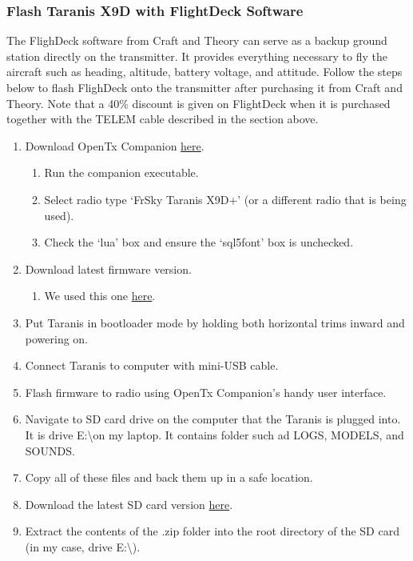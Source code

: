 \documentclass[12pt,journal,compsoc]{IEEEtran}
\begin{document}
\subsubsection{Flash Taranis X9D with FlightDeck Software}
The FlighDeck software from Craft and Theory can serve as a backup ground station directly on the transmitter. It provides everything necessary to fly the aircraft such as heading, altitude, battery voltage, and attitude. Follow the steps below to flash FlighDeck onto the transmitter after purchasing it from Craft and Theory. Note that a 40\% discount is given on FlightDeck when it is purchased together with the TELEM cable described in the section above.
\begin{enumerate}
\item Download OpenTx Companion \href{https://www.open-tx.org}{here}.
	\begin{enumerate}
	\item Run the companion executable.
	\item Select radio type `FrSky Taranis X9D+' (or a different radio that is being used).
	\item Check the `lua' box and ensure the `sql5font' box is unchecked.
	\end{enumerate}
\item Download latest firmware version.
	\begin{enumerate}
	\item We used this one \href{https://www.open-tx.org/2019/01/06/opentx-2.2.3}{here}.
	\end{enumerate}
\item Put Taranis in bootloader mode by holding both horizontal trims inward and powering on.
\item Connect Taranis to computer with mini-USB cable.
\item Flash firmware to radio using OpenTx Companion's handy user interface.
\item Navigate to SD card drive on the computer that the Taranis is plugged into. It is drive E:\textbackslash on my laptop. It contains folder such ad LOGS, MODELS, and SOUNDS.
\item Copy all of these files and back them up in a safe location.
\item Download the latest SD card version \href{https://downloads.open-tx.org/2.2/sdcard/opentx-x9d%2B/}{here}. %
\item Extract the contents of the .zip folder into the root directory of the SD card (in my case, drive E:\textbackslash).

\end{enumerate}
\end{document}
